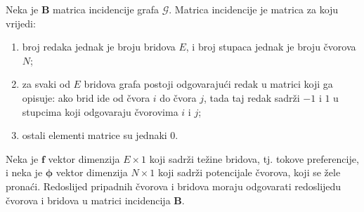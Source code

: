 \documentclass[lmodern, utf8, diplomski, numeric]{fer}
\newcommand{\matr}[1]{\mathbold{#1}}
\newcommand{\graph}[1]{\mathcal{#1}}
\begin{document}
  Neka je $\matr{B}$ matrica incidencije grafa $\graph{G}$.
  Matrica incidencije je matrica za koju vrijedi:
  \begin{enumerate}
    \item broj redaka jednak je broju bridova $E$, i broj stupaca jednak je broju čvorova $N$;
    \item za svaki od $E$ bridova grafa postoji odgovarajući redak u matrici koji ga opisuje: ako brid ide od čvora $i$ do čvora $j$, tada taj redak sadrži $-1$ i $1$ u stupcima koji odgovaraju čvorovima $i$ i $j$;
    \item ostali elementi matrice su jednaki 0.
  \end{enumerate}
  Neka je $\matr{f}$ vektor dimenzija $E \times 1$ koji sadrži težine bridova, tj. tokove preferencije,
  i neka je $\matr{\phi}$ vektor dimenzija $N \times 1$ koji sadrži potencijale čvorova, koji se žele pronaći.
  Redoslijed pripadnih čvorova i bridova moraju odgovarati redoslijedu čvorova i bridova u matrici incidencija $\matr{B}$.
  
\end{document}

